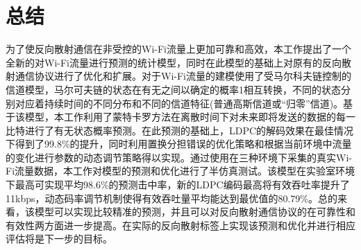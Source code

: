 
\chapter{总结}
\label{chap:conclusion}

为了使反向散射通信在非受控的Wi-Fi流量上更加可靠和高效，本工作提出了一个全新的对Wi-Fi流量进行预测的统计模型，同时在此模型的基础上对原有的反向散射通信协议进行了优化和扩展。对于Wi-Fi流量的建模使用了受马尔科夫链控制的信道模型，马尔可夫链的状态在有无之间以确定的概率1相互转换，不同的状态分别对应着持续时间的不同分布和不同的信道特征(普通高斯信道或“归零”信道)。基于该模型，本工作利用了蒙特卡罗方法在离散时间下对未来即将发送的数据的每一比特进行了有无状态概率预测。在此预测的基础上，LDPC的解码效果在最佳情况下得到了99.8\%的提升，同时利用置换分担错误的优化策略和根据当前环境中流量的变化进行参数的动态调节策略得以实现。通过使用在三种环境下采集的真实Wi-Fi流量数据，本工作对模型的预测和优化进行了半仿真测试。该模型在实验室环境下最高可实现平均98.6\%的预测击中率，新的LDPC编码最高将有效吞吐率提升了11kbps，动态码率调节机制使得有效吞吐量平均能达到最优值的80.79\%。总的来看，该模型可以实现比较精准的预测，并且可以对反向散射通信协议的在可靠性和有效性两方面进一步提高。在实际的反向散射标签上实现该预测和优化并进行相应评估将是下一步的目标。